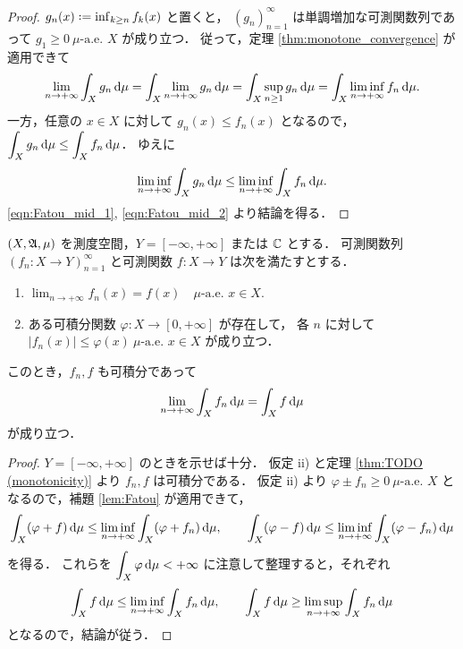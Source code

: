 \begin{proof}
    $g_n(x)\defeq\inf_{k\ge n}f_k(x)$ と置くと，
    $(g_n)_{n=1}^\infty$ は単調増加な可測関数列であって $g_1\ge0\ \text{$\mu$-a.e.\ $X$}$ が成り立つ．
    従って，定理 \ref{thm:monotone_convergence} が適用できて
    \begin{align}
        \lim_{n\to+\infty}\int_Xg_n\,\mathrm{d}\mu
        =\int_X\lim_{n\to+\infty}g_n\,\mathrm{d}\mu
        =\int_X\sup_{n\ge1}g_n\,\mathrm{d}\mu
        =\int_X\liminf_{n\to+\infty}f_n\,\mathrm{d}\mu.\label{eqn:Fatou_mid_1}
    \end{align}
    一方，任意の $x\in X$ に対して $g_n(x)\le f_n(x)$ となるので，$\displaystyle\int_Xg_n\,\mathrm{d}\mu\le\int_Xf_n\,\mathrm{d}\mu$．
    ゆえに
    \begin{align}
        \liminf_{n\to+\infty}\int_Xg_n\,\mathrm{d}\mu\le\liminf_{n\to+\infty}\int_Xf_n\,\mathrm{d}\mu.
        \label{eqn:Fatou_mid_2}
    \end{align}
    \eqref{eqn:Fatou_mid_1}, \eqref{eqn:Fatou_mid_2} より結論を得る．
\end{proof}

\begin{theorem}\label{thm:dominated_convergence}
    $(X,\mathfrak{A},\mu)$ を測度空間，$Y=[-\infty,+\infty]$ または $\mathbb{C}$ とする．
    可測関数列 $(f_n:X\to Y)_{n=1}^\infty$ と可測関数 $f:X\to Y$ は次を満たすとする．
    \begin{enumerate}
        \item $\displaystyle\lim_{n\to+\infty}f_n(x)=f(x)\quad\text{$\mu$-a.e.\ $x\in X$}$.
        \item ある可積分関数 $\varphi:X\to[0,+\infty]$ が存在して，
            各 $n$ に対して $|f_n(x)|\le\varphi(x)\ \text{$\mu$-a.e.\ $x\in X$}$ が成り立つ．
    \end{enumerate}
    このとき，$f_n,f$ も可積分であって
    \begin{align*}
        \lim_{n\to+\infty}\int_Xf_n\,\mathrm{d}\mu=\int_Xf\,\mathrm{d}\mu
    \end{align*}
    が成り立つ．
\end{theorem}

\begin{proof}
    $Y=[-\infty,+\infty]$ のときを示せば十分．
    仮定 \textrm{ii)} と定理 \ref{thm:TODO (monotonicity)} より $f_n,f$ は可積分である．
    仮定 \textrm{ii)} より $\varphi\pm f_n\ge0\ \text{$\mu$-a.e.\ $X$}$ となるので，補題 \ref{lem:Fatou} が適用できて，
    \begin{align*}
        \int_X(\varphi+f)\,\mathrm{d}\mu\le\liminf_{n\to+\infty}\int_X(\varphi+f_n)\,\mathrm{d}\mu,\qquad
        \int_X(\varphi-f)\,\mathrm{d}\mu\le\liminf_{n\to+\infty}\int_X(\varphi-f_n)\,\mathrm{d}\mu
    \end{align*}
    を得る．
    これらを $\displaystyle\int_X\varphi\,\mathrm{d}\mu<+\infty$ に注意して整理すると，それぞれ
    \begin{align*}
        \int_Xf\,\mathrm{d}\mu\le\liminf_{n\to+\infty}\int_Xf_n\,\mathrm{d}\mu,\qquad
        \int_Xf\,\mathrm{d}\mu\ge\limsup_{n\to+\infty}\int_Xf_n\,\mathrm{d}\mu
    \end{align*}
    となるので，結論が従う．
\end{proof}
